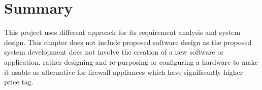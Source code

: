 \documentclass[../index.tex]{subfiles}
\begin{document}
\section{Summary}

This project uses different approach for its requirement analysis and system design. This chapter
does not include proposed software design as the proposed system development does not involve the
creation of a new software or application, rather designing and re-purposing or configuring a
hardware to make it usable as alternative for firewall appliances which have significantly higher
price tag.
\end{document}
